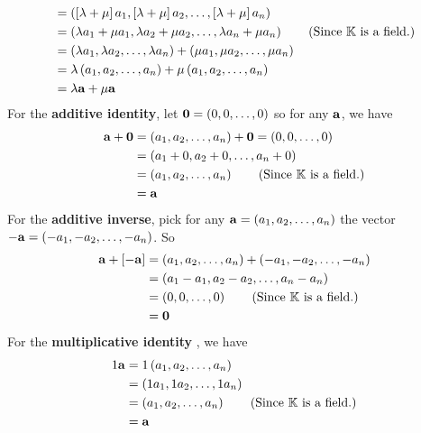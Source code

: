 \begin{example}
\begin{align*}
  &= \left(\left[ \lambda + \mu \right] a_{1},\left[ \lambda + \mu \right]a_{2}, \dots, \left[ \lambda + \mu \right]a_{n} \right) \\
  &= \left( \lambda a_{1} + \mu a_{1}, \lambda a_{2} + \mu a_{2}, \dots, \lambda a_{n} + \mu a_{n} \right) \tag{Since $\mathbb{K}$ is a field.} \\ 
  &= \left( \lambda a_{1}, \lambda a_{2}, \dots, \lambda a_{n} \right) + \left( \mu a_{1}, \mu a_{2}, \dots, \mu a_{n} \right) \\
  &= \lambda \left( a_{1}, a_{2}, \dots, a_{n} \right) + \mu \left( a_{1}, a_{2}, \dots, a_{n} \right) \\
  &= \lambda \vb{a} + \mu \vb{a}
\end{align*}
For the \textbf{additive identity}, let \( \vb{0} = \left( 0, 0, \dots, 0 \right) \) so for any \( \vb{a} \), we have 
\begin{align*}
  \vb{a} + \vb{0} &= \left( a_{1}, a_{2}, \dots, a_{n} \right)  +  \vb{0} = \left( 0, 0, \dots, 0 \right) \\
  &=  \left( a_{1} + 0, a_{2} + 0, \dots, a_{n} +0 \right) \\
  &=  \left( a_{1}, a_{2}, \dots, a_{n} \right) \tag{Since $\mathbb{K}$ is a field.} \\ 
  &= \vb{a}
\end{align*}
For the \textbf{additive inverse}, pick for any \( \vb{a} = \left( a_{1}, a_{2}, \dots, a_{n} \right) \) the vector \( - \vb{a} = \left(- a_{1}, -a_{2}, \dots, -a_{n} \right) \). So 
\begin{align*}
  \vb{a} + \left[ - \vb{a} \right] &= \left( a_{1}, a_{2}, \dots, a_{n} \right) + \left(- a_{1}, -a_{2}, \dots, -a_{n} \right) \\
  &= \left( a_{1} - a_{1},  a_{2} - a_{2}, \dots,  a_{n} - a_{n} \right) \\
  &= \left( 0, 0, \dots, 0 \right) \tag{Since $\mathbb{K}$ is a field.} \\
  &= \vb{0}
\end{align*}
For the \textbf{multiplicative identity} , we have 
\begin{align*}
  1 \vb{a} &= 1 \left( a_{1}, a_{2}, \dots, a_{n} \right)  \\
  &= \left(1 a_{1}, 1a_{2}, \dots, 1a_{n} \right) \\
  &= \left( a_{1}, a_{2}, \dots, a_{n} \right) \tag{Since $\mathbb{K}$ is a field.}  \\
  &= \vb{a}
\end{align*}

\end{example}

